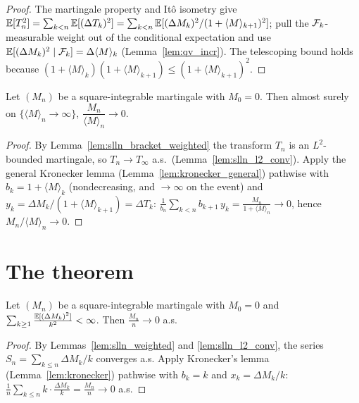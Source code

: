 \begin{proof}\leanok
{}
The martingale property and Itô isometry give
$\mathbb{E}[T_n^2]=\sum_{k<n}\mathbb{E}[(\Delta T_k)^2]=\sum_{k<n}\mathbb{E}[(\Delta M_k)^2/(1+\langle M\rangle_{k+1})^2]$;
pull the $\mathcal{F}_k$-measurable weight out of the conditional expectation and use
$\mathbb{E}[(\Delta M_k)^2\mid\mathcal{F}_k]=\Delta\langle M\rangle_k$ (Lemma~\ref{lem:qv_incr}). The telescoping
bound holds because $(1+\langle M\rangle_k)(1+\langle M\rangle_{k+1})\le(1+\langle M\rangle_{k+1})^2$.
\end{proof}

\begin{theorem}\label{thm:mart_slln_bracket}
\leanok
{}
Let $(M_n)$ be a square-integrable martingale with $M_0=0$. Then almost surely on
$\{\langle M\rangle_n\to\infty\}$, $\dfrac{M_n}{\langle M\rangle_n}\to0$.
\end{theorem}

\begin{proof}\leanok
{}
By Lemma~\ref{lem:slln_bracket_weighted} the transform $T_n$ is an $L^2$-bounded martingale, so
$T_n\to T_\infty$ a.s.\ (Lemma~\ref{lem:slln_l2_conv}). Apply the general Kronecker lemma
(Lemma~\ref{lem:kronecker_general}) pathwise with $b_k=1+\langle M\rangle_k$ (nondecreasing, and
$\to\infty$ on the event) and $y_k=\Delta M_k/(1+\langle M\rangle_{k+1})=\Delta T_k$:
$\frac1{b_n}\sum_{k<n} b_{k+1}\,y_k=\frac{M_n}{1+\langle M\rangle_n}\to0$, hence
$M_n/\langle M\rangle_n\to0$.
\end{proof}

\section{The theorem}
\label{sec:pre_slln_thm}

\begin{theorem}\label{thm:mart_slln}
\leanok
{}
Let $(M_n)$ be a square-integrable martingale with $M_0 = 0$ and
$\sum_{k\ge1}\frac{\mathbb{E}[(\Delta M_k)^2]}{k^2} < \infty$. Then $\frac{M_n}{n}\to 0$
a.s.
\end{theorem}

\begin{proof}\leanok
By Lemmas~\ref{lem:slln_weighted} and \ref{lem:slln_l2_conv}, the series
$S_n = \sum_{k\le n}\Delta M_k/k$ converges a.s. Apply Kronecker's lemma
(Lemma~\ref{lem:kronecker}) pathwise with $b_k = k$ and $x_k = \Delta M_k/k$:
$\frac{1}{n}\sum_{k\le n} k\cdot\frac{\Delta M_k}{k} = \frac{M_n}{n}\to 0$ a.s.
\end{proof}

